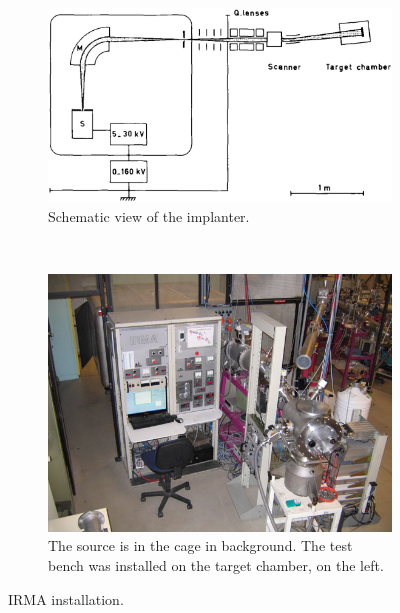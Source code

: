 \begin{figure}[!ht]
	\begin{subfigure}[t]{0.5\textwidth}
		\includegraphics[width=\textwidth]{04_IPHI_Test/figures/fig000_IRMA01}
		\caption{Schematic view of the implanter.}
		\label{}
	\end{subfigure}
	~
	\begin{subfigure}[t]{0.5\textwidth}
		\includegraphics[width=\textwidth]{04_IPHI_Test/figures/fig000_IRMA02}
		\caption{The source is in the cage in background. The test bench was installed on the target chamber, on the left.}
		\label{}
	\end{subfigure}
	\caption[IRMA installation]{IRMA installation.}
	\label{chap4:IRMA}
\end{figure}
